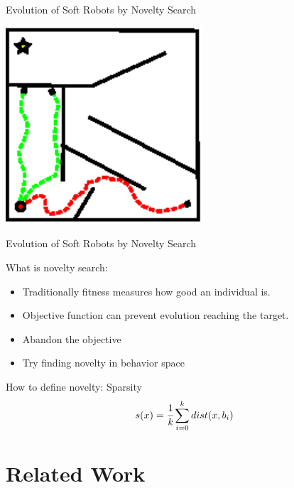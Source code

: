 \documentclass[6pt]{beamer}
\begin{document}
\begin{frame}{{\scriptsize Evolution of Soft Robots by} Novelty Search}
\begin{center}
\includegraphics[width=0.55\textwidth]{../Figures/Misc/maze4.eps}
\end{center}
\end{frame}

\begin{frame}{{\scriptsize Evolution of Soft Robots by} Novelty Search}
\begin{block}{What is novelty search:}
\begin{itemize}
\item Traditionally fitness measures how good an individual is.
\item Objective function can prevent evolution reaching the target.
\item Abandon the objective
\item Try finding novelty in behavior space
\end{itemize}
\end{block}
\begin{block}{How to define novelty: Sparsity}
\begin{equation*}
s(x) = \cfrac{1}{k} \sum_{i=0}^k dist(x, b_i)
\end{equation*}
\end{block}
\end{frame}







\section{Related Work}
\end{document}

